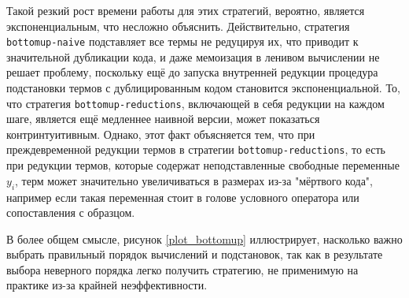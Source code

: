 \documentclass[../diploma.tex]{subfiles}
\begin{document}
Такой резкий рост времени работы для этих стратегий, вероятно, является экспоненциальным, что несложно объяснить. Действительно, стратегия \texttt{bottomup-naive} подставляет все термы не редуцируя их, что приводит к значительной дубликации кода, и даже мемоизация в ленивом вычислении не решает проблему, поскольку ещё до запуска внутренней редукции процедура подстановки термов с дублицированным кодом становится экспоненциальной. То, что стратегия \texttt{bottomup-reductions}, включающей в себя редукции на каждом шаге, является ещё медленнее наивной версии, может показаться контринтуитивным. Однако, этот факт объясняется тем, что при преждевременной редукции термов в стратегии \texttt{bottomup-reductions}, то есть при редукции термов, которые содержат неподставленные свободные переменные $y_i$, терм может значительно увеличиваться в размерах из-за "мёртвого кода", например если такая переменная стоит в голове условного оператора или сопоставления с образцом. 

В более общем смысле, рисунок \ref{plot_bottomup} иллюстрирует, насколько важно выбрать правильный порядок вычислений и подстановок, так как в результате выбора неверного порядка легко получить стратегию, не применимую на практике из-за крайней неэффективности.
\end{document}
